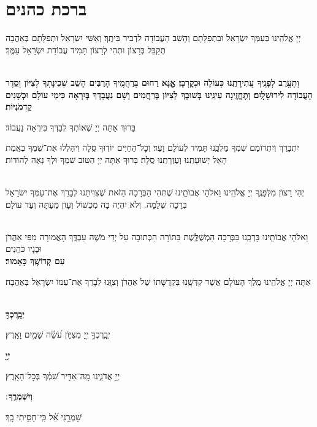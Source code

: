 \documentclass[twoside, openany, parskip=half, 11pt]{book}
\begin{document}
\section[ברכת כהנים]{ ברכת כהנים ‎}
\label{birkaskohanim}

יְיָ אֱלֹהֵֽינוּ בְּעַמְּךָ יִשְׂרָאֵל וּבִתְפִלָּתָם וְהָשֵׁב הָעֲבוֹדָה לִדְבִיר בֵּיתֶֽךָ׃ וְאִשֵּׁי יִשְׂרָאֵל וּתְפִלָּתָם בְּאַהֲבָה תְקַבֵּל בְּרָצוֹן וּתְהִי לְרָצוֹן תָּמִיד עֲבוֹדַת יִשְׂרָאֵל עַמֶּֽךָ׃

\chazzanvkahal \\
\textbf{
וְתֶעֱרַב לְפָנֶֽיךָ עֲתִירָתֵֽנוּ כְּעוֹלָה וּכְקׇרְבָּן׃
אׇׇׇנָּא רַחוּם בְּרַחֲמֶֽיךָ הָרַבִּים הָשֵׁב שְׁכִינָתְךָ לְצִיּוֹן וְסֵֽדֶר הָעֲבוֹדָה לִירוּשָׁלָֽיִם׃
וְתֶחֱזֶֽינָה עֵינֵֽינוּ בְּשׁוּבְךָ לְצִיּוֹן בְּרַחֲמִים
וְשָׁם נַעֲבׇדְךָ בְּיִרְאָה כִּימֵי עוֹלָם וּכְשָׁנִים קַדְמֹנִיּוֹת׃
}

\chazzan
בָּרוּךְ אַתָּה יְיָ שֶׁאוֹתְךָ לְבַדְּךָ בְּיִרְאָה נַעֲבוֹד׃

\modim

יִתְבָּרַךְ וְיִתְרוֹמַם שִׁמְךָ מַלְכֵּֽנוּ תָּמִיד לְעוֹלָם וָעֶד׃ וְכׇל־הַחַיִּים יוֹדֽוּךָ סֶּֽלָה וִיהַלְלוּ אֶת־שִׁמְךָ בֶּאֱמֶת הָאֵל יְשׁוּעָתֵֽנוּ וְעֶזְרָתֵֽנוּ סֶֽלָה׃ בָּרוּךְ אַתָּה יְיָ הַטּוֹב שִׁמְךָ וּלְךָ נָאֶה לְהוֹדוֹת׃

\\
יְהִי רָצוׂן מִלְּפָנֶֽךָ יְיָ אֱלֹהֵֽינוּ וֵאלֹהֵי אֲבוׂתֵֽינוּ שֶׁתְּהִי הַבְּרָכָה הַזֹּאת שֶׁצִּוִּיתָנוּ לְבָרֵךְ אֶת־עַמְּךָ יִשׂרָאֵל בְּרָכָה שְׁלֵמָה. וְלֹא יִהְיֶה בָּה מִכְשׁוֹל וְעָוׂן מֵעַתָּה וְעַד עוׂלָם׃

\\
\shatz {}
וֵאלֹהֵי אֲבוֹתֵֽינוּ בָּרְכֵֽנוּ בַּבְּרָכָה הַמְשֻׁלֶּֽשֶׁת בַּתּוֹרָה הַכְּתוּבָה עַל יְדֵי מֹשֶׁה עַבְדֶּֽךָ הָאֲמוּרָה מִפִּי אַהֲרֹן וּבָנָיו כֹּהֲנִים \\
\shatzvkahal
\textbf{עַם קְדוֹשֶֽׁךָ כָּאָמוּר׃}

אַתָּה יְיָ אֱלֹהֵֽינוּ מֶֽלֶךְ הָעוֹלָם אֲשֶׁר קִדְּשָֽׁנוּ בִּקְדֻשָּׁתוֹ שֶׁל אַהֲרֹן וְצִוָּֽנוּ לְבָרֵךְ אֶת־עַמּוֹ יִשְׂרָאֵל בְּאַהֲבָה׃


\\
\textbf{יְבָֽרֶכְךָ֥}
\hfill \begin{footnotesize}
 יְבָֽרֶכְךָ֣ יְ֖יָ מִצִּיּ֑וֹן עֹ֝שֵׂ֗ה שָׁמַ֥יִם וָאָֽרֶץ׃\\
\end{footnotesize}
\textbf{יְיָ֖}
\hfill \begin{footnotesize}
 יְיָ֥ אֲדֹנֵ֑ינוּ מָֽה־אַדִּ֥יר שִׁ֝מְ֗ךָ בְּכׇל־הָאָֽרֶץ׃\\
\end{footnotesize}
\textbf{וְיִשְׁמְרֶֽךָ}
׃ \hfill \begin{footnotesize}
 שָׁמְרֵ֥נִי אֵ֝֗ל כִּֽי־חָסִ֥יתִי בָֽךְ׃
\end{footnotesize}
\end{document}

